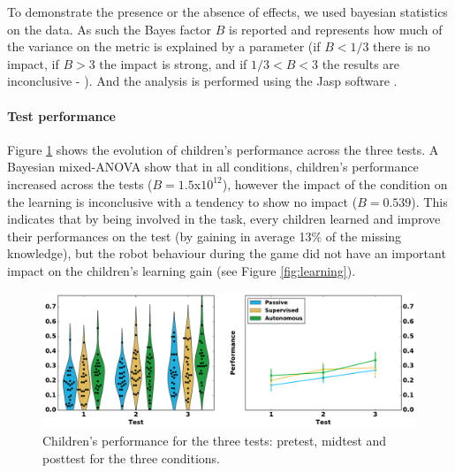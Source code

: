 To demonstrate the presence or the absence of effects, we used bayesian statistics on the data. As such the Bayes factor $B$ is reported and represents how much of the variance on the metric is explained by a parameter (if $B < 1/3$ there is no impact, if $B > 3$ the impact is strong, and if $1/3<B<3$ the results are inconclusive - \cite{jeffreys1998theory,dienes2011bayesian}). And the analysis is performed using the Jasp software \cite{jasp2018}.



\paragraph{Test performance}

Figure \ref{fig:performance} shows the evolution of children's performance across the three tests. A Bayesian mixed-ANOVA show that in all conditions, children's performance increased across the tests ($B=1.5$x$10^{12}$), however the impact of the condition on the learning is inconclusive with a tendency to show no impact ($B=0.539$). This indicates that by being involved in the task, every children learned and improve their performances on the test (by gaining in average 13\% of the missing knowledge), but the robot behaviour during the game did not have an important impact on the children's learning gain (see Figure \ref{fig:learning}).

\begin{figure}[ht]
	\includegraphics[width=1\linewidth]{perf.pdf}
	\centering
	\caption{Children's performance for the three tests: pretest, midtest and posttest for the three conditions.}
	\label{fig:performance}
\end{figure}

